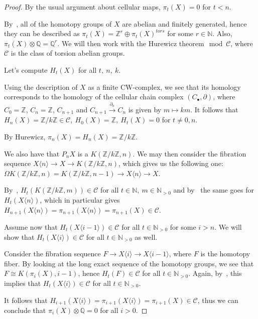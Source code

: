 \documentclass{article}
\newcommand{\numberset}{\mathbb}
\newcommand{\N}{\numberset{N}}
\newcommand{\Z}{\numberset{Z}}
\newcommand{\Q}{\numberset{Q}}
\begin{document}
\begin{proof}    
    By the usual argument about cellular maps, $\pi_t(X)=0$ for $t<n$.
    
    By~\cite[thm. 12.1]{HM19}, all of the homotopy groups of $X$ are abelian and
    finitely generated, hence they can be described as
    $\pi_t(X)=\Z^r\oplus\pi_t(X)^{tors}$ for some $r\in\N$. Also,
    $\pi_t(X)\otimes\Q=\Q^r$. We will then work with the Hurewicz
    theorem$\mod\mathcal{C}$, where $\mathcal{C}$ is the class of torsion
    abelian groups.
    
    Let's compute $H_t(X)$ for all $t,\ n,\ k$.

    Using the description of $X$ as a finite CW-complex, we see that its
    homology corresponds to the homology of the cellular chain complex
    $(C_\bullet,\partial)$, where $C_0=\Z$, $C_n=\Z$, $C_{n+1}$ and
    $C_{n+1}\xrightarrow{\partial_n}C_n$ is given by $m\mapsto km$. It follows
    that $H_n(X)=\Z/k\Z\in\mathcal{C},\ H_0(X)=\Z,\ H_t(X)=0$ for $t\neq 0,n$.

    By Hurewicz, $\pi_n(X)=H_n(X)=\Z/k\Z$.

    We also have that $P_nX$ is a $K(\Z/k\Z,n)$. We may then consider the
    fibration sequence $X\langle n\rangle\rightarrow X\rightarrow K(\Z/k\Z,n)$,
    which gives us the following one: $\Omega
    K(\Z/k\Z,n)=K(\Z/k\Z,n-1)\rightarrow X\langle n\rangle\rightarrow X$.

    By~\cite[lemma 13.16]{HM19}, $H_t(K(\Z/k\Z,m))\in\mathcal{C}$ for all
    $t\in\N,\ m\in\N_{>0}$ and by~\cite[lemma 13.15]{HM19} the same goes for
    $H_t(X\langle n\rangle)$, which in particular gives
    $H_{n+1}(X\langle n\rangle)=\pi_{n+1}(X\langle
    n\rangle)=\pi_{n+1}(X)\in\mathcal{C}$.

    Assume now that $H_t(X\langle i-1\rangle)\in\mathcal{C}$ for all
    $t\in\N_{>0}$ for some $i>n$. We will show that $H_t(X\langle
    i\rangle)\in\mathcal{C}$ for all $t\in\N_{>0}$ as well.

    Consider the fibration sequence $F\rightarrow X\langle i\rangle\rightarrow
    X\langle i-1\rangle$, where $F$ is the homotopy fiber. By looking at the
    long exact sequence of the homotopy groups, we see that $F\cong
    K(\pi_i(X),i-1)$, hence $H_t(F)\in\mathcal{C}$ for all $t\in\N_{>0}$. Again,
    by~\cite[lemma 13.15]{HM19}, this implies that
    $H_t(X\langle i\rangle)\in\mathcal{C}$ for all $t\in\N_{>0}$.
    
    It follows that $H_{i+1}(X\langle i\rangle)=\pi_{i+1}(X\langle
    i\rangle)=\pi_{i+1}(X)\in\mathcal{C}$, thus we can conclude that
    $\pi_i(X)\otimes\Q=0$ for all $i>0$.
\end{proof}

\printbibliography
\end{document}
